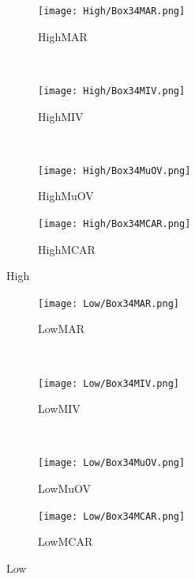 \documentclass{article}
\begin{document}
	
	\begin{figure}
		\centering
		\begin{subfigure}[b]{0.45\textwidth}
			\texttt{[image: High/Box34MAR.png]}
			\caption{HighMAR}
			\label{fig:HighMAR}
		\end{subfigure}
		~ %
		\begin{subfigure}[b]{0.45\textwidth}
			\texttt{[image: High/Box34MIV.png]}
			\caption{HighMIV}
			\label{fig:HighMIV}
		\end{subfigure}
		\newline
		~ %
		\begin{subfigure}[b]{0.45\textwidth}
			\texttt{[image: High/Box34MuOV.png]}
			\caption{HighMuOV}
			\label{fig:HighMuOV}
		\end{subfigure}
		\begin{subfigure}[b]{0.45\textwidth}
			\texttt{[image: High/Box34MCAR.png]}
			\caption{HighMCAR}
			\label{fig:HighMCAR}
		\end{subfigure}
		\caption{High}\label{fig:High}
	\end{figure}
	
	
	\begin{figure}
		\centering
		\begin{subfigure}[b]{0.45\textwidth}
			\texttt{[image: Low/Box34MAR.png]}
			\caption{LowMAR}
			\label{fig:LowMAR}
		\end{subfigure}
		~ %
		\begin{subfigure}[b]{0.45\textwidth}
			\texttt{[image: Low/Box34MIV.png]}
			\caption{LowMIV}
			\label{fig:LowMIV}
		\end{subfigure}
		\newline
		~ %
		\begin{subfigure}[b]{0.45\textwidth}
			\texttt{[image: Low/Box34MuOV.png]}
			\caption{LowMuOV}
			\label{fig:LowMuOV}
		\end{subfigure}
		\begin{subfigure}[b]{0.45\textwidth}
			\texttt{[image: Low/Box34MCAR.png]}
			\caption{LowMCAR}
			\label{fig:LowMCAR}
		\end{subfigure}
		\caption{Low}\label{fig:Low}
	\end{figure}
	
\end{document}
